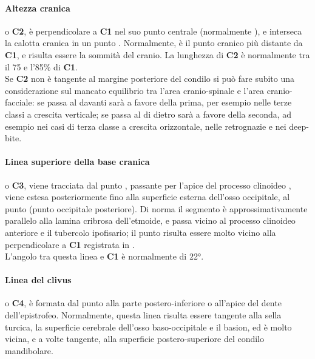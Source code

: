 \paragraph{Altezza cranica} o \textbf{C2}, è perpendicolare a \textbf{C1} nel suo punto centrale (normalmente ), e interseca la calotta cranica in un punto . Normalmente,  è il punto cranico più distante da \textbf{C1}, e  risulta essere la sommità del cranio. La lunghezza di \textbf{C2} è normalmente tra il 75 e l'85\% di \textbf{C1}.\\
Se \textbf{C2} non è tangente al margine posteriore del condilo si può fare subito una considerazione sul mancato equilibrio tra l'area cranio-spinale e l'area cranio-facciale: se passa al davanti sarà a favore della prima, per esempio nelle terze classi a crescita verticale; se passa al di dietro sarà a favore della seconda, ad esempio nei casi di terza classe a crescita orizzontale, nelle retrognazie e nei deep-bite.

\paragraph{Linea superiore della base cranica} o \textbf{C3}, viene tracciata dal punto , passante per l'apice del processo clinoideo , viene estesa posteriormente fino alla superficie esterna dell'osso occipitale, al punto  (punto occipitale posteriore). Di norma il segmento  è approssimativamente parallelo alla lamina cribrosa dell'etmoide, e passa vicino al processo clinoideo anteriore e il tubercolo ipofisario; il punto  risulta essere molto vicino alla perpendicolare a \textbf{C1} registrata in .\\
L'angolo tra questa linea e \textbf{C1} è normalmente di 22°.

\paragraph{Linea del clivus} o \textbf{C4}, è formata dal punto  alla parte postero-inferiore o all'apice del dente dell'epistrofeo. Normalmente, questa linea risulta essere tangente alla sella turcica, la superficie cerebrale dell'osso baso-occipitale e il basion, ed è molto vicina, e a volte tangente, alla superficie postero-superiore del condilo mandibolare.

